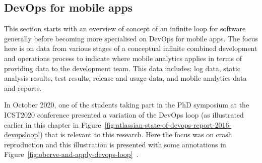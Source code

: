 \subsection{DevOps for mobile apps}
This section starts with an overview of  concept of an infinite loop for software generally before becoming more specialised on DevOps for mobile apps. %
The focus here is on data from various stages of a conceptual infinite combined development and operations process to indicate where mobile analytics applies in terms of providing data to the development team. This data includes: log data, static analysis results, test results, release and usage data, and mobile analytics data and reports.

In October 2020, one of the students taking part in the PhD symposium at the ICST2020 conference presented a variation of the DevOps loop (as illustrated earlier in this chapter in Figure~\ref{fig:atlassian-state-of-devops-report-2016-devopsloop}) that is relevant to this research. Here the focus was on crash reproduction and this illustration is presented with some annotations in Figure~\ref{fig:oberve-and-apply-devops-loop}~. %

